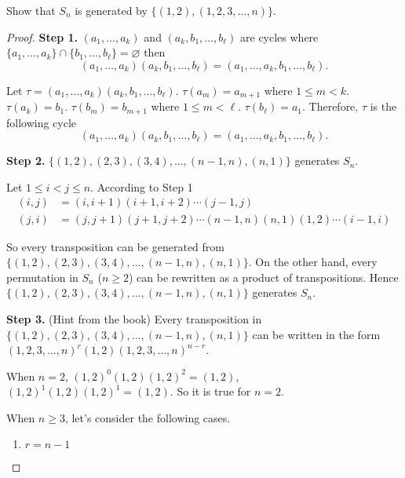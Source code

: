 \newpage
\begin{exercise}
    Show that $S_{n}$ is generated by $\{ (1,2), (1,2,3,\ldots, n) \}$.
\end{exercise}

\begin{proof}
    \textbf{Step 1.} $(a_{1}, \ldots, a_{k})$ and $(a_{k}, b_{1}, \ldots, b_{\ell})$ are cycles where $\{ a_{1}, \ldots, a_{k} \} \cap \{ b_{1}, \ldots, b_{\ell} \} = \varnothing$ then
    \[
        (a_{1}, \ldots, a_{k})(a_{k}, b_{1}, \ldots, b_{\ell}) = (a_{1},\ldots,a_{k},b_{1},\ldots,b_{\ell}).
    \]

    Let $\tau = (a_{1}, \ldots, a_{k})(a_{k}, b_{1}, \ldots, b_{\ell})$. $\tau(a_{m}) = a_{m+1}$ where $1\leq m < k$. $\tau(a_{k}) = b_{1}$. $\tau(b_{m}) = b_{m+1}$ where $1\leq m < \ell$. $\tau(b_{\ell}) = a_{1}$. Therefore, $\tau$ is the following cycle
    \[
        (a_{1}, \ldots, a_{k})(a_{k}, b_{1}, \ldots, b_{\ell}) = (a_{1},\ldots,a_{k},b_{1},\ldots,b_{\ell}).
    \]

    \textbf{Step 2.} $\{ (1,2), (2,3), (3,4), \ldots, (n-1,n), (n,1) \}$ generates $S_{n}$.

    Let $1\leq i < j\leq n$. According to Step 1
    \begin{align*}
        (i, j) & = (i,i+1)(i+1,i+2)\cdots (j-1,j)                         \\
        (j, i) & = (j,j+1)(j+1,j+2)\cdots (n-1,n)(n,1)(1,2)\cdots (i-1,i)
    \end{align*}

    So every transposition can be generated from $\{ (1,2), (2,3), (3,4), \ldots, (n-1,n), (n,1) \}$. On the other hand, every permutation in $S_{n}$ ($n\geq 2$) can be rewritten as a product of transpositions. Hence $\{ (1,2), (2,3), (3,4), \ldots, (n-1,n), (n,1) \}$ generates $S_{n}$.

    \textbf{Step 3.} (Hint from the book) Every transposition in $\{ (1,2), (2,3), (3,4), \ldots, (n-1,n), (n,1) \}$ can be written in the form ${(1,2,3,\ldots,n)}^{r}(1,2){(1,2,3,\ldots,n)}^{n-r}$.

    When $n = 2$, ${(1,2)}^{0}(1,2){(1,2)}^{2} = (1,2)$, ${(1,2)}^{1}(1,2){(1,2)}^{1} = (1,2)$. So it is true for $n = 2$.

    When $n\geq 3$, let's consider the following cases.

    \begin{enumerate}[label={\textbf{Case \arabic*.}},itemindent=1cm]
        \item $r = n-1$


\end{enumerate}
\end{proof}
